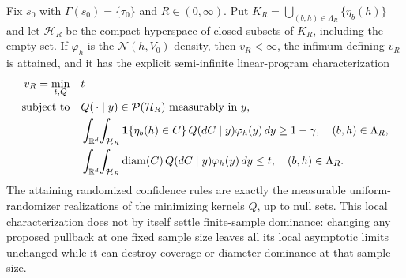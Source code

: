 Fix \(s_0\) with \(\Gamma(s_0)=\{\tau_0\}\) and \(R\in(0,\infty)\).  Put \(K_R=\bigcup_{(b,h)\in\Lambda_R}\{\eta_b(h)\}\) and let \(\mathcal H_R\) be the compact hyperspace of closed subsets of \(K_R\), including the empty set.  If \(\varphi_h\) is the \(\mathcal N(h,V_0)\) density, then \(v_R<\infty\), the infimum defining \(v_R\) is attained, and it has the explicit semi-infinite linear-program characterization
\[
\begin{aligned}
v_R=\min_{t,Q}\quad &t\\
\text{subject to}\quad
&Q(\,\cdot\mid y)\in\mathcal P(\mathcal H_R)\text{ measurably in }y,\\
&\int_{\mathbb R^d}\!\int_{\mathcal H_R}
  {\bf1}\{\eta_b(h)\in C\}\,Q(dC\mid y)\varphi_h(y)\,dy
  \ge1-\gamma,\quad (b,h)\in\Lambda_R,\\
&\int_{\mathbb R^d}\!\int_{\mathcal H_R}
  \operatorname{diam}(C)\,Q(dC\mid y)\varphi_h(y)\,dy
  \le t,\quad (b,h)\in\Lambda_R.
\end{aligned}
\]
The attaining randomized confidence rules are exactly the measurable uniform-randomizer realizations of the minimizing kernels \(Q\), up to null sets.  This local characterization does not by itself settle finite-sample dominance: changing any proposed pullback at one fixed sample size leaves all its local asymptotic limits unchanged while it can destroy coverage or diameter dominance at that sample size.